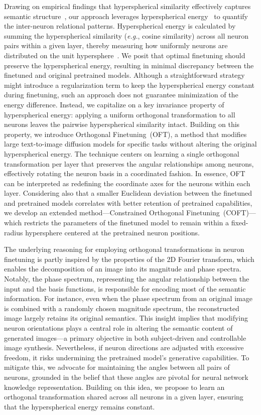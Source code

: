 Drawing on empirical findings that hyperspherical similarity effectively captures semantic structure~\cite{liu2017deep,liu2018decoupled,chen2020angular}, our approach leverages hyperspherical energy~\cite{liu2018learning} to quantify the inter-neuron relational patterns. Hyperspherical energy is calculated by summing the hyperspherical similarity (\emph{e.g.}, cosine similarity) across all neuron pairs within a given layer, thereby measuring how uniformly neurons are distributed on the unit hypersphere~\cite{liu2021learning}. We posit that optimal finetuning should preserve the hyperspherical energy, resulting in minimal discrepancy between the finetuned and original pretrained models. Although a straightforward strategy might introduce a regularization term to keep the hyperspherical energy constant during finetuning, such an approach does not guarantee minimization of the energy difference. Instead, we capitalize on a key invariance property of hyperspherical energy: applying a uniform orthogonal transformation to all neurons leaves the pairwise hyperspherical similarity intact. Building on this property, we introduce Orthogonal Finetuning~(OFT), a method that modifies large text-to-image diffusion models for specific tasks without altering the original hyperspherical energy. The technique centers on learning a single orthogonal transformation per layer that preserves the angular relationships among neurons, effectively rotating the neuron basis in a coordinated fashion. In essence, OFT can be interpreted as redefining the coordinate axes for the neurons within each layer. Considering also that a smaller Euclidean deviation between the finetuned and pretrained models correlates with better retention of pretrained capabilities, we develop an extended method—Constrained Orthogonal Finetuning~(COFT)—which restricts the parameters of the finetuned model to remain within a fixed-radius hypersphere centered at the pretrained neuron positions.

The underlying reasoning for employing orthogonal transformations in neuron finetuning is partly inspired by the properties of the 2D Fourier transform, which enables the decomposition of an image into its magnitude and phase spectra. Notably, the phase spectrum, representing the angular relationship between the input and the basis functions, is responsible for encoding most of the semantic information. For instance, even when the phase spectrum from an original image is combined with a randomly chosen magnitude spectrum, the reconstructed image largely retains its original semantics. This insight implies that modifying neuron orientations plays a central role in altering the semantic content of generated images—a primary objective in both subject-driven and controllable image synthesis. Nevertheless, if neuron directions are adjusted with excessive freedom, it risks undermining the pretrained model's generative capabilities. To mitigate this, we advocate for maintaining the angles between all pairs of neurons, grounded in the belief that these angles are pivotal for neural network knowledge representation. Building on this idea, we propose to learn an orthogonal transformation shared across all neurons in a given layer, ensuring that the hyperspherical energy remains constant.

